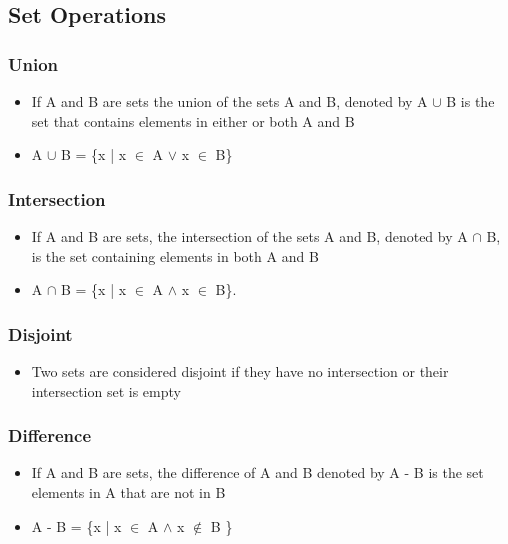 \documentclass[11pt]{article}
\begin{document}
\subsection{Set Operations}
\label{sec-2-2}
\subsubsection{Union}
\label{sec-2-2-1}
\begin{itemize}

\item If A and B are sets the union of the sets A and B, denoted by A $\cup$ B is the set that contains elements in either or both A and B
\label{sec-2-2-1-1}%

\item A $\cup$ B = \{x | x $\in$ A $\vee$ x $\in$ B\}
\label{sec-2-2-1-2}%
\end{itemize} %
\subsubsection{Intersection}
\label{sec-2-2-2}
\begin{itemize}

\item If A and B are sets, the intersection of the sets A and B, denoted by A $\cap$ B, is the set containing elements in both A and B
\label{sec-2-2-2-1}%

\item A $\cap$ B = \{x | x $\in$ A $\wedge$ x $\in$ B\}.
\label{sec-2-2-2-2}%
\end{itemize} %
\subsubsection{Disjoint}
\label{sec-2-2-3}
\begin{itemize}

\item Two sets are considered disjoint if they have no intersection or their intersection set is empty
\label{sec-2-2-3-1}%
\end{itemize} %
\subsubsection{Difference}
\label{sec-2-2-4}
\begin{itemize}

\item If A and B are sets, the difference of A and B denoted by A - B is the set elements in A that are not in B
\label{sec-2-2-4-1}%

\item A - B = \{x | x $\in$ A $\wedge$ x $\notin$ B \}
\label{sec-2-2-4-2}%
\end{itemize} %
\end{document}
